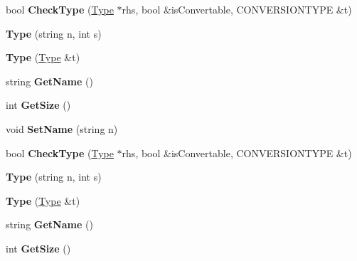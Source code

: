 \begin{DoxyCompactItemize}
\item 
\hypertarget{classType_a2574b17ddc03d5ca13309811d06f1a56}{bool {\bfseries Check\-Type} (\hyperlink{classType}{Type} $\ast$rhs, bool \&is\-Convertable, C\-O\-N\-V\-E\-R\-S\-I\-O\-N\-T\-Y\-P\-E \&t)}\label{classType_a2574b17ddc03d5ca13309811d06f1a56}

\item 
\hypertarget{classType_a0ec88e19865012d53e20b97677218783}{{\bfseries Type} (string n, int s)}\label{classType_a0ec88e19865012d53e20b97677218783}

\item 
\hypertarget{classType_a617481e51492ea14507c83d5dba2cce5}{{\bfseries Type} (\hyperlink{classType}{Type} \&t)}\label{classType_a617481e51492ea14507c83d5dba2cce5}

\item 
\hypertarget{classType_a8143fe4686ae1a5709a5955396c6ee26}{string {\bfseries Get\-Name} ()}\label{classType_a8143fe4686ae1a5709a5955396c6ee26}

\item 
\hypertarget{classType_afe0fca035825759785b525d2a24f69fe}{int {\bfseries Get\-Size} ()}\label{classType_afe0fca035825759785b525d2a24f69fe}

\item 
\hypertarget{classType_ab8d2328a3a76289edf42b9bf0d4f278f}{void {\bfseries Set\-Name} (string n)}\label{classType_ab8d2328a3a76289edf42b9bf0d4f278f}

\item 
\hypertarget{classType_a2574b17ddc03d5ca13309811d06f1a56}{bool {\bfseries Check\-Type} (\hyperlink{classType}{Type} $\ast$rhs, bool \&is\-Convertable, C\-O\-N\-V\-E\-R\-S\-I\-O\-N\-T\-Y\-P\-E \&t)}\label{classType_a2574b17ddc03d5ca13309811d06f1a56}

\item 
\hypertarget{classType_a0ec88e19865012d53e20b97677218783}{{\bfseries Type} (string n, int s)}\label{classType_a0ec88e19865012d53e20b97677218783}

\item 
\hypertarget{classType_a617481e51492ea14507c83d5dba2cce5}{{\bfseries Type} (\hyperlink{classType}{Type} \&t)}\label{classType_a617481e51492ea14507c83d5dba2cce5}

\item 
\hypertarget{classType_a8143fe4686ae1a5709a5955396c6ee26}{string {\bfseries Get\-Name} ()}\label{classType_a8143fe4686ae1a5709a5955396c6ee26}

\item 
\hypertarget{classType_afe0fca035825759785b525d2a24f69fe}{int {\bfseries Get\-Size} ()}\label{classType_afe0fca035825759785b525d2a24f69fe}


\end{DoxyCompactItemize}
